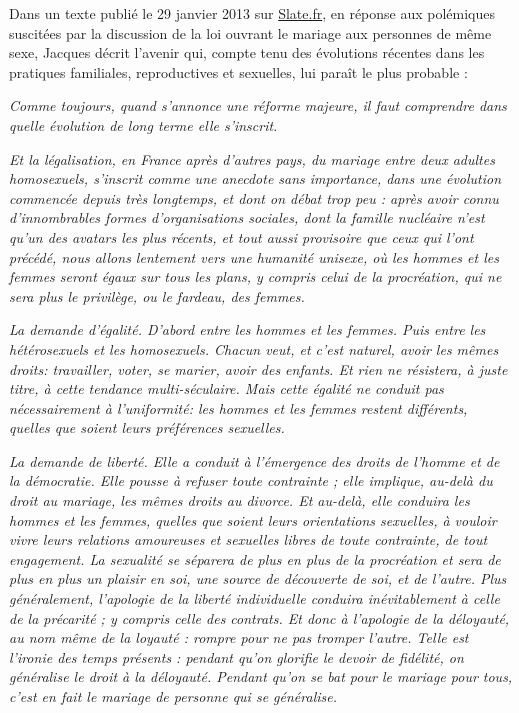 Dans un texte publié le 29 janvier 2013 sur \href{http://www.slate.fr}{Slate.fr}, en réponse aux polémiques suscitées par la discussion de la loi ouvrant le mariage aux personnes de même sexe, Jacques  décrit l'avenir qui, compte tenu des évolutions récentes dans les pratiques familiales, reproductives et sexuelles, lui paraît le plus probable  : 

\begin{displayquote}
\emph{Comme toujours, quand s'annonce une réforme majeure, il faut comprendre dans quelle évolution de long terme elle s'inscrit.}
 
\emph{Et la légalisation, en France après d'autres pays, du mariage entre deux adultes homosexuels, s'inscrit comme une anecdote sans importance, dans une évolution commencée depuis très longtemps, et dont on débat trop peu : après avoir connu d'innombrables formes d'organisations sociales, dont la famille nucléaire n'est qu'un des avatars les plus récents, et tout aussi provisoire que ceux qui l'ont précédé, nous allons lentement vers une humanité unisexe, où les hommes et les femmes seront égaux sur tous les plans, y compris celui de la procréation, qui ne sera plus le privilège, ou le fardeau, des femmes.} 
 
\emph{\primo La demande d'égalité. D'abord entre les hommes et les femmes. Puis entre les hétérosexuels et les homosexuels. Chacun veut, et c'est naturel, avoir les mêmes droits: travailler, voter, se marier, avoir des enfants. Et rien ne résistera, à juste titre, à cette tendance multi-séculaire. Mais cette égalité ne conduit pas nécessairement à l'uniformité: les hommes et les femmes restent différents, quelles que soient leurs préférences sexuelles.}
 
\emph{\secundo La demande de liberté. Elle a conduit à l'émergence des droits de l'homme et de la démocratie. Elle pousse à refuser toute contrainte ; elle implique, au-delà du droit au mariage, les mêmes droits au divorce. Et au-delà, elle conduira les hommes et les femmes, quelles que soient leurs orientations sexuelles, à vouloir vivre leurs relations amoureuses et sexuelles libres de toute contrainte, de tout engagement. La sexualité se séparera de plus en plus de la procréation et sera de plus en plus un plaisir en soi, une source de découverte de soi, et de l'autre. Plus généralement, l'apologie de la liberté individuelle conduira inévitablement à celle de la précarité ; y compris celle des contrats. Et donc à l'apologie de la déloyauté, au nom même de la loyauté : rompre pour ne pas tromper l'autre. Telle est l'ironie des temps présents : pendant qu'on glorifie le devoir de fidélité, on généralise le droit à la déloyauté. Pendant qu'on se bat pour le mariage pour tous, c'est en fait le mariage de personne qui se généralise.}
 

\end{displayquote}
